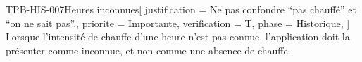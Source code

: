 \begin{exigence}{TPB-HIS-007}{Heures inconnues}[
    justification = {Ne pas confondre \enquote{pas chauffé} et \enquote{on ne sait pas}.},
    priorite      = {Importante},
    verification  = {T},
    phase         = {Historique},
  ]
  Lorsque l'intensité de chauffe d'une heure n'est pas connue, l'application doit la
  présenter comme inconnue, et non comme une absence de chauffe.
\end{exigence}

